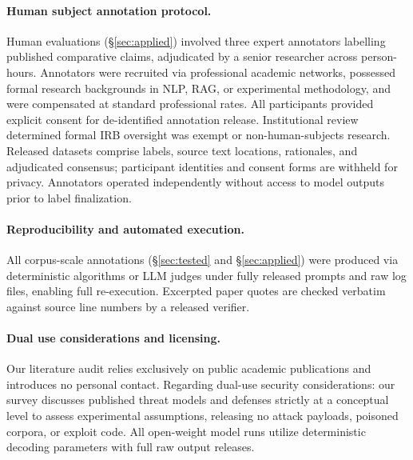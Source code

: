 \paragraph{Human subject annotation protocol.}
Human evaluations (\S\ref{sec:applied}) involved three expert annotators labelling \HumN{} published comparative claims, adjudicated by a senior researcher across \HumHours{} person-hours. Annotators were recruited via professional academic networks, possessed formal research backgrounds in NLP, RAG, or experimental methodology, and were compensated at standard professional rates. All participants provided explicit consent for de-identified annotation release. Institutional review determined formal IRB oversight was exempt or non-human-subjects research. Released datasets comprise labels, source text locations, rationales, and adjudicated consensus; participant identities and consent forms are withheld for privacy. Annotators operated independently without access to model outputs prior to label finalization.

\paragraph{Reproducibility and automated execution.}
All corpus-scale annotations (\S\ref{sec:tested} and \S\ref{sec:applied}) were produced via deterministic algorithms or LLM judges under fully released prompts and raw log files, enabling full re-execution. Excerpted paper quotes are checked verbatim against source line numbers by a released verifier.

\paragraph{Dual use considerations and licensing.}
Our literature audit relies exclusively on public academic publications and introduces no personal contact. Regarding dual-use security considerations: our survey discusses published threat models and defenses strictly at a conceptual level to assess experimental assumptions, releasing no attack payloads, poisoned corpora, or exploit code. All open-weight model runs utilize deterministic decoding parameters with full raw output releases.





